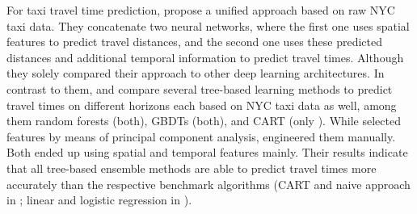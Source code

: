 For taxi travel time prediction, \cite{jindal2017unified} propose a unified approach based on raw NYC taxi data. They concatenate two neural networks, where the first one uses spatial features to predict travel distances, and the second one uses these predicted distances and additional temporal information to predict travel times. Although they solely compared their approach to other deep learning architectures.
In contrast to them, \cite{Huang2018_GBDT} and \cite{huang2020travel_GBDT} compare several tree-based learning methods to predict travel times on different horizons each based on NYC taxi data as well, among them random forests (both), GBDTs (both), and CART (only \cite{huang2020travel_GBDT}). While \cite{Huang2018_GBDT} selected features by means of principal component analysis, \cite{huang2020travel_GBDT} engineered them manually. Both ended up using spatial and temporal features mainly. Their results indicate that all tree-based ensemble methods are able to predict travel times more accurately than the respective benchmark algorithms (CART and naive approach in \cite{huang2020travel_GBDT}; linear and logistic regression in \cite{Huang2018_GBDT}).


